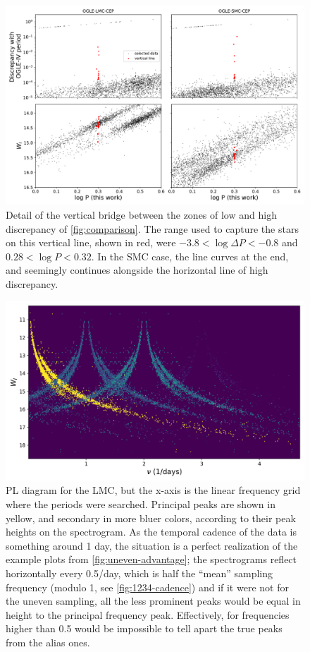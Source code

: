 \begin{figure}
	\centering
	\includegraphics[width=\textwidth]{img/vertial_line_detail.pdf}
	\caption[Detail of the vertical line on the discrepancy plot]{
		Detail of the vertical bridge between the zones of low and high discrepancy of \autoref{fig:comparison}.
		The range used to capture the stars on this vertical line, shown in red, were $-3.8<\log \Delta P < -0.8$ and $0.28 < \log P < 0.32 $.
		In the SMC case, the line curves at the end, and seemingly continues alongside the horizontal line of high discrepancy.
	}
	\label{fig:vertical-discrepancy}
\end{figure}


\begin{figure}
	\centering
	\includegraphics[width=\textwidth]{img/lmc_freq.png}
	\caption[Linear frequency PL relation with secondary peaks for the LMC]{
		PL diagram for the LMC, but the x-axis is the linear frequency grid where the periods were searched.
		Principal peaks are shown in yellow, and secondary in more bluer colors, according to their peak heights on the spectrogram.
		As the temporal cadence of the data is something around 1 day, the situation is a perfect realization of the example plots from \autoref{fig:uneven-advantage};
		the spectrograms reflect horizontally every 0.5/day, which is half the \enquote{mean} sampling frequency (modulo 1, see \autoref{fig:1234-cadence}) and 
		if it were not for the uneven sampling, all the less prominent peaks would be equal in height to the principal frequency peak.
		Effectively, for frequencies higher than 0.5 would be impossible to tell apart the true peaks from the alias ones.
	}
	\label{fig:linear-color-pl-lmc}
\end{figure}
